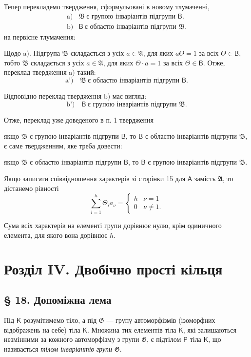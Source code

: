 \documentclass[11pt]{article}
\begin{document}
Тепер перекладемо твердження, сформульовані в новому тлумаченні,
\[
\begin{array}{ll}
\text{a)}& \mathfrak B\ \text{є групою інваріантів підгрупи }\mathsf B.\\
\text{b)}& \mathsf B\ \text{є областю інваріантів підгрупи }\mathfrak B.
\end{array}
\]
на первісне тлумачення:

Щодо a). Підгрупа \(\mathfrak B\) складається з усіх \(a\in\mathfrak A\), для яких \(a\Theta=1\) за всіх \(\Theta\in\mathsf B\), тобто \(\mathfrak B\) складається з усіх \(a\in\mathfrak A\), для яких \(\Theta\cdot a=1\) за всіх \(\Theta\in\mathsf B\). Отже, переклад твердження a) такий:
\[
\text{a')} \quad \mathfrak B\ \text{є областю інваріантів підгрупи }\mathsf B.
\]

Відповідно переклад твердження b) має вигляд:
\[
\text{b')} \quad \mathsf B\ \text{є групою інваріантів підгрупи }\mathfrak B.
\]

Отже, переклад уже доведеного в п. 1 твердження

якщо \(\mathfrak B\) є групою інваріантів підгрупи \(\mathsf B\), то \(\mathsf B\) є областю інваріантів підгрупи \(\mathfrak B\),
є саме твердженням, яке треба довести:

якщо \(\mathfrak B\) є областю інваріантів підгрупи \(\mathsf B\), то \(\mathsf B\) є групою інваріантів підгрупи \(\mathfrak B\).

Якщо записати співвідношення характерів зі сторінки 15 для \(\mathsf A\) замість \(\mathfrak A\), то дістанемо рівності
\[
\sum_{i=1}^{h} \Theta_i a_\nu =
\begin{cases}
h & \nu=1\\
0 & \nu\ne 1.
\end{cases}
\]

Сума всіх характерів на елементі групи дорівнює нулю, крім одиничного елемента, для якого вона дорівнює \(h\).

\section*{Розділ IV. Двобічно прості кільця}\label{kapitel-iv.-zweiseitig-einfache-ringe}

\subsection*{§ 18. Допоміжна лема}\label{ein-hilfssatz}

Під \(\mathsf K\) розумітимемо тіло, а під \(\mathfrak G\) --- групу автоморфізмів (ізоморфних відображень на себе) тіла \(\mathsf K\). Множина тих елементів тіла \(\mathsf K\), які залишаються незмінними за кожного автоморфізму з групи \(\mathfrak G\), є підтілом \(\mathsf P\) тіла \(\mathsf K\), що називається \emph{тілом інваріантів групи} \(\mathfrak G\).
\end{document}
